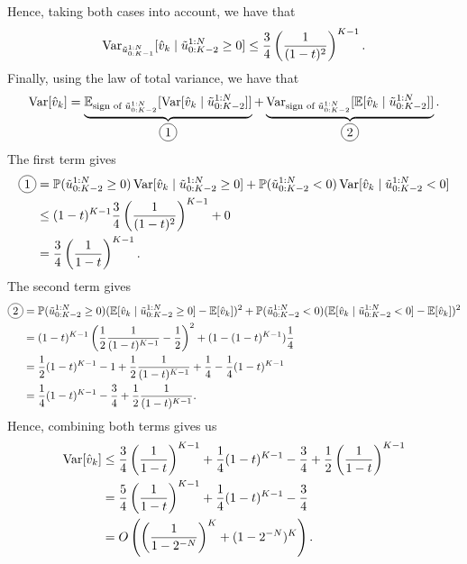 Hence, taking both cases into account, we have that
\begin{equation}
    \operatorname{Var}_{\tilde{u}_{0:K-1}^{1:N}}[ \hat{v}_k \mid \tilde{u}_{0:K-2}^{1:N} \geq 0 ] \leq \frac{3}{4} \left( \frac{1}{ (1-t)^2} \right)^{K-1}.
\end{equation}
Finally, using the law of total variance, we have that
\begin{equation}
    \Var[ \hat{v}_k ] = \underbrace{\E_{\text{sign of } \tilde{u}_{0:K-2}^{1:N}}[ \Var[ \hat{v}_k \mid \tilde{u}_{0:K-2}^{1:N} ] ]}_{\circled{1}} 
    + \underbrace{\Var_{\text{sign of } \tilde{u}_{0:K-2}^{1:N}}[ \E[ \hat{v}_k \mid \tilde{u}_{0:K-2}^{1:N} ] ]}_{\circled{2}}.
\end{equation}
The first term gives
\begin{align}
    \circled{1}
    &= \mathbb{P}(\tilde{u}^{1:N}_{0:K-2} \geq 0) \Var[ \hat{v}_k \mid \tilde{u}_{0:K-2}^{1:N} \geq 0 ] + \mathbb{P}(\tilde{u}^{1:N}_{0:K-2} < 0) \Var[ \hat{v}_k \mid \tilde{u}_{0:K-2}^{1:N} < 0 ] \\
    &\leq (1 - t)^{K-1} \frac{3}{4} \left( \frac{1}{ (1-t)^2} \right)^{K-1} + 0 \\
    &= \frac{3}{4} \left(\frac{1}{1-t} \right)^{K-1}.
\end{align}
The second term gives
\begin{align}
    \circled{2}
    &= \mathbb{P}(\tilde{u}^{1:N}_{0:K-2} \geq 0) (\E[ \hat{v}_k \mid \tilde{u}_{0:K-2}^{1:N} \geq 0 ] - \E[ \hat{v}_k ])^2 + \mathbb{P}(\tilde{u}^{1:N}_{0:K-2} < 0) (\E[ \hat{v}_k \mid \tilde{u}_{0:K-2}^{1:N} < 0 ] - \E[ \hat{v}_k ])^2 \\
    &= (1 - t)^{K-1} \left( \frac{1}{2} \frac{1}{(1-t)^{K-1}} - \frac{1}{2} \right)^2 + (1 - (1 - t)^{K-1}) \frac{1}{4} \\
    &= \frac{1}{2} (1 - t)^{K-1} - 1 + \frac{1}{2} \frac{1}{(1-t)^{K-1}} + \frac{1}{4} - \frac{1}{4} (1 - t)^{K-1} \\
    &= \frac{1}{4} (1 - t)^{K-1} - \frac{3}{4} + \frac{1}{2} \frac{1}{(1-t)^{K-1}}.
\end{align}
Hence, combining both terms gives us
\begin{align}
    \operatorname{Var}[ \hat{v}_k ]
    &\leq \frac{3}{4} \left(\frac{1}{1-t} \right)^{K-1} + \frac{1}{4} (1 - t)^{K-1} - \frac{3}{4} + \frac{1}{2} \left(\frac{1}{1-t}\right)^{K-1} \\
    &= \frac{5}{4} \left(\frac{1}{1-t} \right)^{K-1} + \frac{1}{4} (1 - t)^{K-1} - \frac{3}{4} \\
    &= O\left( \left(\frac{1}{1 - 2^{-N}}\right)^{K} + (1-2^{-N})^{K} \right).
\end{align}

